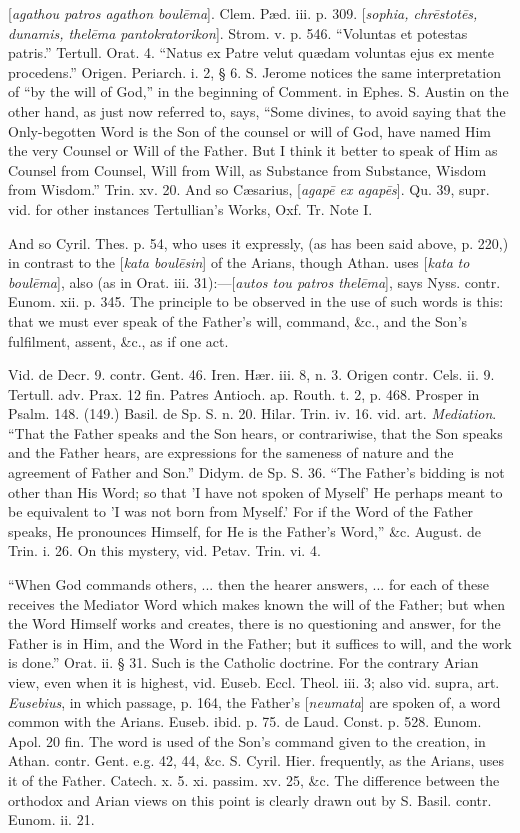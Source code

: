 [\emph{agathou patros agathon boul\={e}ma}].
Clem. Pæd. iii. p. 309. [\emph{sophia, chr\={e}stot\={e}s, dunamis,
thel\={e}ma pantokratorikon}]. Strom. v. p. 546. “Voluntas et
potestas patris.” Tertull. Orat. 4. “Natus ex Patre velut quædam
voluntas ejus ex mente procedens.” Origen. Periarch. i. 2, § 6. S.
Jerome notices the same interpretation of “by the will of God,” in
the beginning of Comment. in Ephes. S. Austin on the other hand, as
just now referred to, says, “Some divines, to avoid saying that the
Only-begotten Word is the Son of the counsel or will of God, have
named Him the very Counsel or Will of the Father. But I think it
better to speak of Him as Counsel from Counsel, Will from Will, as
Substance from Substance, Wisdom from Wisdom.” Trin. xv. 20. And so
Cæsarius, [\emph{agap\={e} ex agap\={e}s}]. Qu. 39, supr. vid.
for other instances Tertullian’s Works, Oxf. Tr. Note I.

And so Cyril. Thes. p. 54, who uses it expressly,
(as has been said above, p. 220,) in contrast to the [\emph{kata boul\={e}sin}]
of the Arians, though Athan. uses [\emph{kata} \emph{to boul\={e}ma}],
also (as in Orat. iii. 31):—[\emph{autos tou patros thel\={e}ma}],
says Nyss. contr. Eunom. xii. p. 345. The principle to be observed in
the use of such words is this: that we must ever speak of the
Father’s will, command, \&c., and the Son’s fulfilment, assent,
\&c., as if one act.

Vid. de Decr. 9. contr. Gent. 46. Iren. Hær.
iii. 8, n. 3. Origen contr. Cels. ii. 9. Tertull. adv. Prax. 12 fin.
Patres Antioch. ap. Routh. t. 2, p. 468. Prosper in Psalm. 148. (149.)
Basil. de Sp. S. n. 20. Hilar. Trin. iv. 16. vid. art. \emph{Mediation}.
“That the Father speaks and the Son hears, or contrariwise, that the
Son speaks and the Father hears, are expressions for the sameness of
nature and the agreement of Father and Son.” Didym. de Sp. S. 36.
“The Father’s bidding is not other than His Word; so that 'I have
not spoken of Myself' He perhaps meant to be equivalent to 'I was not
born from Myself.' For if the Word of the Father speaks, He pronounces
Himself, for He is the Father’s Word,” \&c. August. de Trin. i.
26. On this mystery, vid. Petav. Trin. vi. 4.

“When God commands others, ... then the hearer
answers, ... for each of these receives the Mediator Word which makes
known the will of the Father; but when the Word Himself works and
creates, there is no questioning and answer, for the Father is in Him,
and the Word in the Father; but it suffices to will, and the work is
done.” Orat. ii. § 31. Such is the Catholic doctrine. For the
contrary Arian view, even when it is highest, vid. Euseb. Eccl. Theol.
iii. 3; also vid. supra, art. \emph{Eusebius}, in which passage, p.
164, the Father’s [\emph{neumata}] are spoken of, a word
common with the Arians. Euseb. ibid. p. 75. de Laud. Const. p. 528.
Eunom. Apol. 20 fin. The word is used of the Son’s command given to
the creation, in Athan. contr. Gent. e.g. 42, 44, \&c. S. Cyril.
Hier. frequently, as the Arians, uses it of the Father. Catech. x. 5.
xi. passim. xv. 25, \&c. The difference between the orthodox and
Arian views on this point is clearly drawn out by S. Basil. contr.
Eunom. ii. 21.

